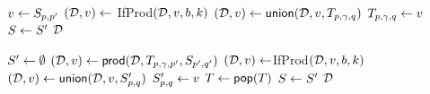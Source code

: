 \begin{algorithm}[t]
\begin{varwidth}[t]{0.5\textwidth}
\begin{algorithmic}[1]
\State $v\gets S_{p,p'}$\label{nested:line33}
\State $(\mathcal{D},v) \gets $ {\sc IfProd}$(\mathcal{D}, v, b, k)$\label{nested:line34}
\State $(\mathcal{D},v) \gets \mathsf{union}(\mathcal{D},v,T_{p,\gamma,q})$\label{nested:line35}
\State $T_{p,\gamma,q}\gets v$\label{nested:line36}
\EndIf
\EndFor
\State $S \gets S'$
\State \Return $\mathcal{D}$
\EndProcedure

\State

\State $S'\gets\emptyset$\label{nested:line41}
\label{nested:line43}
\State $(\mathcal{D},v)\gets\mathsf{prod}(\mathcal{D},T_{p,\gamma,p'},S_{p',q'})$\label{nested:line44}
\State $(\mathcal{D},v) \gets ${\sc IfProd}$(\mathcal{D}, v, b, k)$\label{nested:line45}
\State $(\mathcal{D},v)\gets\mathsf{union}(\mathcal{D},v,S'_{p,q})$\label{nested:line46}
\State $S'_{p,q}\gets v$\label{nested:line47}
\EndIf
\EndFor
\State $T\gets\mathsf{pop}(T)$\label{nested:line48}
\State $S \gets S'$\label{nested:line49}
\State \Return $\mathcal{D}$
\EndProcedure


\end{algorithmic}
\end{varwidth}
\end{algorithm}
